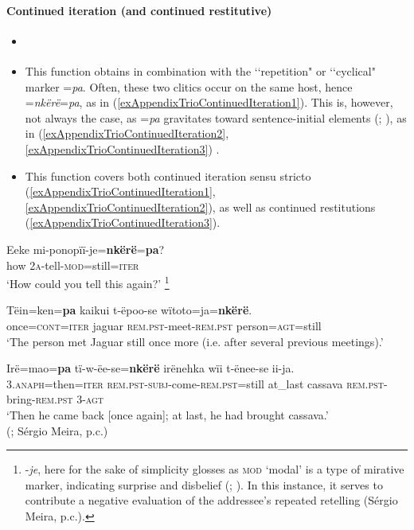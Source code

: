 \paragraph{Continued iteration (and continued restitutive)}
\label{appendixTrioContinuedIteration}
\begin{itemize}
	\item \textcite[468–469]{Meira1999}
	\item This function obtains in combination with the \lq\lq repetition" \parencite{Meira1999} or \lq\lq cyclical" \parencite{Carlin2004} marker \mbox{=\textit{pa}}. Often, these two clitics occur on the same host, hence \mbox{=\textit{nkërë}=\textit{pa}}, as in (\ref{exAppendixTrioContinuedIteration1}). This is, however, not always the case, as \mbox{=\textit{pa}} gravitates toward sentence-initial elements (\cite[453]{Meira1999}; \cite[430]{Carlin2004}), as in (\ref{exAppendixTrioContinuedIteration2}, \ref{exAppendixTrioContinuedIteration3}) .
	\item This function covers both continued iteration sensu stricto (\ref{exAppendixTrioContinuedIteration1}, \ref{exAppendixTrioContinuedIteration2}), as well as continued restitutions (\ref{exAppendixTrioContinuedIteration3}).
\end{itemize}

\begin{exe}	
	\ex\label{exAppendixTrioContinuedIteration1}
	\gll Eeke mi-ponopïï-je=\textbf{nkërë}=\textbf{pa}?\\
	how 2\textsc{a}-tell-\textsc{mod}=still=\textsc{iter}\\
	\glt \lq How could you tell this again?' \parencite[317]{Meira1999}\footnote{\mbox{-\textit{je}}, here for the sake of simplicity glosses as \textsc{mod} \lq modal' is a type of mirative marker, indicating surprise and disbelief (\cite[298]{Carlin2004}; \cite[316–317]{Meira1999}). In this instance, it serves to contribute a negative evaluation of the addressee's repeated retelling (Sérgio Meira, p.c.).}
	
			
	\ex\label{exAppendixTrioContinuedIteration2}
	\gll
	Tëin=ken=\textbf{pa} kaikui t-ëpoo-se wïtoto=ja=\textbf{nkërë}.\\
	once=\textsc{cont}=\textsc{iter} jaguar \textsc{rem}.\textsc{pst}-meet-\textsc{rem}.\textsc{pst} person=\textsc{agt}=still\\
	\glt \lq The person met Jaguar still once more (i.e. after several previous meetings).' \parencite[469]{Meira1999}
	
	\ex\label{exAppendixTrioContinuedIteration3}
	\gll Irë=mao=\textbf{pa} tï-w-ëe-se=\textbf{nkërë} irënehka wïi t-ënee-se ii-ja.\\
	3.\textsc{anaph}=then=\textsc{iter} \textsc{rem}.\textsc{pst}-\textsc{subj}-come-\textsc{rem}.\textsc{pst}=still at\_last cassava \textsc{rem}.\textsc{pst}-bring-\textsc{rem}.\textsc{pst} 3-\textsc{agt}\\
	\glt \lq Then he came back [once again]; at last, he had brought cassava.'
	\\(\cite[448]{Meira1999}; Sérgio Meira, p.c.) 
\end{exe}

